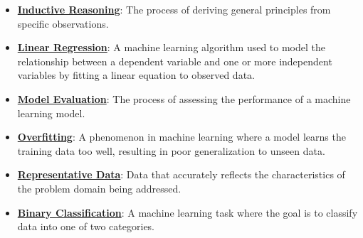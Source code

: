 \documentclass{article}%
\begin{document}
\begin{itemize}[leftmargin=*]%
\item \href{https://purdue.brightspace.com/d2l/common/assets/pdfjs-d2l-dist/1.0.14-legacy/web/viewer.html?file=%2Fcontent%2Fenforced%2F1095467-wl.202510.CS.24300.001%2F05L2-ML Basics.pdf%3Fou%3D1095467&lang=en-us&container=d2l-fileviewer-rendered-pdf&fullscreen=d2l-fileviewer-rendered-pdf-dialog&height=667#page=3}{\textbf{Inductive Reasoning}}: The process of deriving general principles from specific observations.%
\item \href{https://purdue.brightspace.com/d2l/common/assets/pdfjs-d2l-dist/1.0.14-legacy/web/viewer.html?file=%2Fcontent%2Fenforced%2F1095467-wl.202510.CS.24300.001%2F05L2-ML Basics.pdf%3Fou%3D1095467&lang=en-us&container=d2l-fileviewer-rendered-pdf&fullscreen=d2l-fileviewer-rendered-pdf-dialog&height=667#page=6}{\textbf{Linear Regression}}: A machine learning algorithm used to model the relationship between a dependent variable and one or more independent variables by fitting a linear equation to observed data.%
\item \href{https://purdue.brightspace.com/d2l/common/assets/pdfjs-d2l-dist/1.0.14-legacy/web/viewer.html?file=%2Fcontent%2Fenforced%2F1095467-wl.202510.CS.24300.001%2F05L2-ML Basics.pdf%3Fou%3D1095467&lang=en-us&container=d2l-fileviewer-rendered-pdf&fullscreen=d2l-fileviewer-rendered-pdf-dialog&height=667#page=8}{\textbf{Model Evaluation}}: The process of assessing the performance of a machine learning model.%
\item \href{https://purdue.brightspace.com/d2l/common/assets/pdfjs-d2l-dist/1.0.14-legacy/web/viewer.html?file=%2Fcontent%2Fenforced%2F1095467-wl.202510.CS.24300.001%2F05L2-ML Basics.pdf%3Fou%3D1095467&lang=en-us&container=d2l-fileviewer-rendered-pdf&fullscreen=d2l-fileviewer-rendered-pdf-dialog&height=667#page=14}{\textbf{Overfitting}}: A phenomenon in machine learning where a model learns the training data too well, resulting in poor generalization to unseen data.%
\item \href{https://purdue.brightspace.com/d2l/common/assets/pdfjs-d2l-dist/1.0.14-legacy/web/viewer.html?file=%2Fcontent%2Fenforced%2F1095467-wl.202510.CS.24300.001%2F05L2-ML Basics.pdf%3Fou%3D1095467&lang=en-us&container=d2l-fileviewer-rendered-pdf&fullscreen=d2l-fileviewer-rendered-pdf-dialog&height=667#page=5}{\textbf{Representative Data}}: Data that accurately reflects the characteristics of the problem domain being addressed.%
\item \href{https://purdue.brightspace.com/d2l/common/assets/pdfjs-d2l-dist/1.0.14-legacy/web/viewer.html?file=%2Fcontent%2Fenforced%2F1095467-wl.202510.CS.24300.001%2F05L2-ML Basics.pdf%3Fou%3D1095467&lang=en-us&container=d2l-fileviewer-rendered-pdf&fullscreen=d2l-fileviewer-rendered-pdf-dialog&height=667#page=20}{\textbf{Binary Classification}}: A machine learning task where the goal is to classify data into one of two categories.%

\end{itemize}
\end{document}
